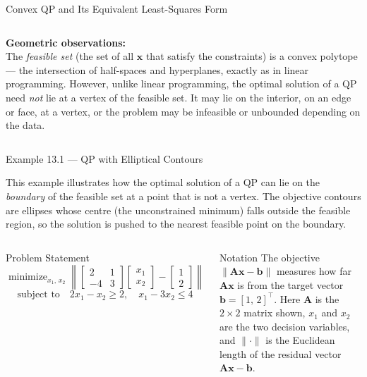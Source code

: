\documentclass[aspectratio=169,10pt]{beamer}
\DeclareMathOperator*{\minimize}{minimize}
\newcommand{\bx}{\mathbf{x}}
\newcommand{\bb}{\mathbf{b}}
\newcommand{\bA}{\mathbf{A}}
\begin{document}
\begin{frame}[allowframebreaks]{Convex QP and Its Equivalent Least-Squares Form}
\begin{columns}[T]
      \textbf{Geometric observations:}\\[0.4em]
      The \emph{feasible set} (the set of all $\bx$ that satisfy the constraints)
      is a convex polytope --- the intersection of half-spaces and hyperplanes,
      exactly as in linear programming.  However, unlike linear programming,
      the optimal solution of a QP need \emph{not} lie at a vertex of the
      feasible set.  It may lie on the interior, on an edge or face, at a vertex,
      or the problem may be infeasible or unbounded depending on the data.
  \end{columns}

\end{frame}

\begin{frame}[allowframebreaks]{Example 13.1 --- QP with Elliptical Contours}

  This example illustrates how the optimal solution of a QP can lie on the
  \emph{boundary} of the feasible set at a point that is not a vertex.  The
  objective contours are ellipses whose centre (the unconstrained minimum)
  falls outside the feasible region, so the solution is pushed to the nearest
  feasible point on the boundary.

  \begin{columns}[T]
      \begin{block}{Problem Statement}
        \[
          \minimize_{x_1,\,x_2}
          \left\|\begin{bmatrix}2&1\\-4&3\end{bmatrix}
          \begin{bmatrix}x_1\\x_2\end{bmatrix}
          - \begin{bmatrix}1\\2\end{bmatrix}\right\|
        \]
        \[
          \text{subject to}\quad
          2x_1 - x_2 \geq 2,\quad
          x_1 - 3x_2 \leq 4
        \]
      \end{block}

      \begin{block}{Notation}
        The objective $\|\bA\bx - \bb\|$ measures how far $\bA\bx$ is from the
        target vector $\bb = [1,\,2]^{\top}$.  Here $\bA$ is the $2\times 2$ matrix
        shown, $x_1$ and $x_2$ are the two decision variables, and $\|\cdot\|$ is the
        Euclidean length of the residual vector $\bA\bx - \bb$.
      \end{block}


\end{columns}
\end{frame}
\end{document}
